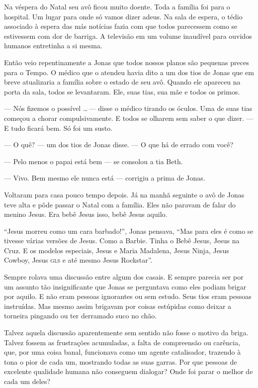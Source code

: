 Na véspera do Natal seu avô ficou muito doente. Toda a família foi para o hospital. Um lugar para onde só vamos dizer adeus. Na sala de espera, o tédio associado à espera das más notícias fazia com que todos parecessem como se estivessem com dor de barriga. A televisão em um volume inaudível para ouvidos humanos entretinha a si mesma.

Então veio repentinamente a Jonas que todos nossos planos são pequenas preces para o Tempo. O médico que o atendeu havia dito a um dos tios de Jonas que em breve atualizaria a família sobre o estado de seu avô. Quando ele apareceu na porta da sala, todos se levantaram. Ele, suas tias, sua mãe e todos os primos.

--- Nós fizemos o possível \ldots\,--- disse o médico tirando os óculos. Uma de suas tias começou a chorar compulsivamente. E todos se olharem sem saber o que dizer. --- E tudo ficará bem. Só foi um susto.

--- O quê? --- um dos tios de Jonas disse. --- O que há de errado com você?

--- Pelo menos o papai está bem --- se consolou a tia Beth.

--- Vivo. Bem mesmo ele nunca está --- corrigiu a prima de Jonas.

Voltaram para casa pouco tempo depois. Já na manhã seguinte o avô de Jonas teve alta e pôde passar o Natal com a família. Eles não paravam de falar do menino Jesus. Era bebê Jesus isso, bebê Jesus aquilo.

``Jesus morreu como um cara barbado!'', Jonas pensava, ``Mas para eles é como se tivesse várias versões de Jesus. Como a Barbie. Tinha o Bebê Jesus, Jesus na Cruz. E os modelos especiais, Jesus e Maria Madalena, Jesus Ninja, Jesus Cowboy, Jesus \textsc{gls} e até mesmo Jesus Rockstar''.

Sempre rolava uma discussão entre algum dos casais. E sempre parecia ser por um assunto tão insignificante que Jonas se perguntava como eles podiam brigar por aquilo. E não eram pessoas ignorantes ou sem estudo. Seus tios eram pessoas instruídas. Mas mesmo assim brigavam por coisas estúpidas como deixar a torneira pingando ou ter derramado suco no chão.

Talvez aquela discussão aparentemente sem sentido não fosse o motivo da briga. Talvez fossem as frustrações acumuladas, a falta de compreensão ou carência, que, por uma coisa banal, funcionava como um agente catalisador, trazendo à tona o pior de cada um, mostrando todas as suas garras. Por que pessoas de excelente qualidade humana não conseguem dialogar? Onde foi parar o melhor de cada um deles?

